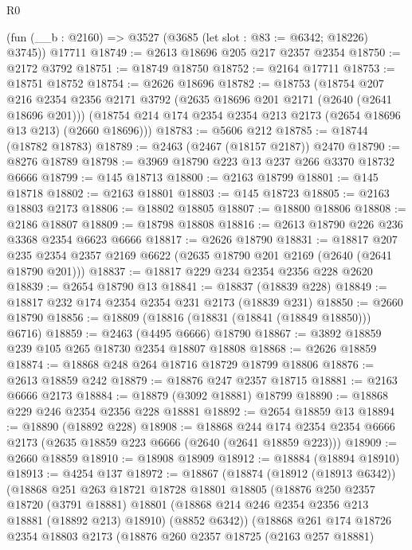 \begin{lexlean}{R0}
\begin{coremodule}
    (fun (__b : @2160) => @3527 (@3685 (let slot : @83 := @6342; @18226) @3745))
    @17711
@18749 := @2613 @18696 @205 @217 @2357 @2354
@18750 := @2172 @3792
@18751 := @18749 @18750
@18752 := @2164 @17711
@18753 := @18751 @18752
@18754 := @2626 @18696
@18782 := @18753
    (@18754
      @207
      @216
      @2354
      @2356
      @2171
      @3792
      (@2635 @18696 @201 @2171 (@2640 (@2641 @18696 @201)))
      (@18754 @214 @174 @2354 @2354 @213 @2173 (@2654 @18696 @13 @213) (@2660 @18696)))
@18783 := @5606 @212
@18785 := @18744 (@18782 @18783)
@18789 := @2463 (@2467 (@18157 @2187)) @2470
@18790 := @8276 @18789
@18798 := @3969 @18790 @223 @13 @237 @266 @3370 @18732 @6666
@18799 := @145 @18713
@18800 := @2163 @18799
@18801 := @145 @18718
@18802 := @2163 @18801
@18803 := @145 @18723
@18805 := @2163 @18803 @2173
@18806 := @18802 @18805
@18807 := @18800 @18806
@18808 := @2186 @18807
@18809 := @18798 @18808
@18816 := @2613 @18790 @226 @236 @3368 @2354 @6623 @6666
@18817 := @2626 @18790
@18831 := @18817
    @207
    @235
    @2354
    @2357
    @2169
    @6622
    (@2635 @18790 @201 @2169 (@2640 (@2641 @18790 @201)))
@18837 := @18817 @229 @234 @2354 @2356 @228 @2620
@18839 := @2654 @18790 @13
@18841 := @18837 (@18839 @228)
@18849 := @18817 @232 @174 @2354 @2354 @231 @2173 (@18839 @231)
@18850 := @2660 @18790
@18856 := @18809 (@18816 (@18831 (@18841 (@18849 @18850))) @6716)
@18859 := @2463 (@4495 @6666) @18790
@18867 := @3892 @18859 @239 @105 @265 @18730 @2354 @18807 @18808
@18868 := @2626 @18859
@18874 := @18868 @248 @264 @18716 @18729 @18799 @18806
@18876 := @2613 @18859 @242
@18879 := @18876 @247 @2357 @18715
@18881 := @2163 @6666 @2173
@18884 := @18879 (@3092 @18881) @18799
@18890 := @18868 @229 @246 @2354 @2356 @228 @18881
@18892 := @2654 @18859 @13
@18894 := @18890 (@18892 @228)
@18908 := @18868
    @244
    @174
    @2354
    @2354
    @6666
    @2173
    (@2635 @18859 @223 @6666 (@2640 (@2641 @18859 @223)))
@18909 := @2660 @18859
@18910 := @18908 @18909
@18912 := @18884 (@18894 @18910)
@18913 := @4254 @137
@18972 := @18867
    (@18874
      (@18912 (@18913 @6342))
      (@18868
        @251
        @263
        @18721
        @18728
        @18801
        @18805
        (@18876
          @250
          @2357
          @18720
          (@3791 @18881)
          @18801
          (@18868 @214 @246 @2354 @2356 @213 @18881 (@18892 @213) @18910)
          (@8852 @6342))
        (@18868
          @261
          @174
          @18726
          @2354
          @18803
          @2173
          (@18876
            @260
            @2357
            @18725
            (@2163 @257 @18881)

\end{coremodule}
\end{lexlean}
